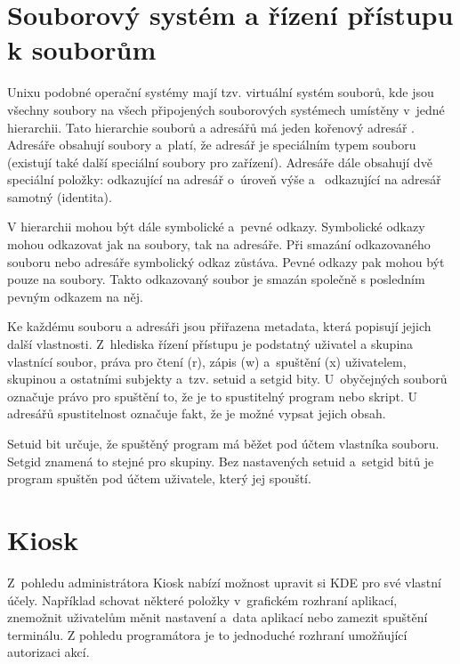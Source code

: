 \section{Souborový systém a řízení přístupu k souborům}
Unixu podobné operační systémy mají tzv. virtuální systém souborů, kde jsou všechny soubory na všech připojených souborových systémech umístěny v~jedné hierarchii. Tato hierarchie souborů a adresářů má jeden kořenový adresář \uv{/}. Adresáře obsahují soubory a~platí, že adresář je speciálním typem souboru (existují také další speciální soubory pro zařízení). Adresáře dále obsahují dvě speciální položky:  odkazující na adresář o~úroveň výše a~ odkazující na adresář samotný (identita).

V hierarchii mohou být dále symbolické a~pevné odkazy. Symbolické odkazy mohou odkazovat jak na soubory, tak na adresáře. Při smazání odkazovaného souboru nebo adresáře symbolický odkaz zůstáva. Pevné odkazy pak mohou být pouze na soubory. Takto odkazovaný soubor je smazán společně s posledním pevným odkazem na něj.

Ke každému souboru a adresáři jsou přiřazena metadata, která popisují jejich další vlastnosti. Z~hlediska řízení přístupu je podstatný uživatel a skupina vlastnící soubor, práva pro čtení (r), zápis (w) a~spuštění (x) uživatelem, skupinou a ostatními subjekty a~tzv. setuid a setgid bity. U~obyčejných souborů označuje právo pro spuštění to, že je to spustitelný program nebo skript. U adresářů spustitelnost označuje fakt, že je možné vypsat jejich obsah.\cite{secureProg, OSP}

Setuid bit určuje, že spuštěný program má běžet pod účtem vlastníka souboru. Setgid znamená to stejné pro skupiny. Bez nastavených setuid a~setgid bitů je program spuštěn pod účtem uživatele, který jej spouští.\cite{secureProg}


\section{Kiosk}
Z~pohledu administrátora Kiosk nabízí možnost upravit si KDE pro své vlastní účely. Například schovat některé položky v~grafickém rozhraní aplikací, znemožnit uživatelům měnit nastavení a~data aplikací nebo zamezit spuštění terminálu. Z pohledu programátora je to jednoduché rozhraní umožňující autorizaci akcí.

